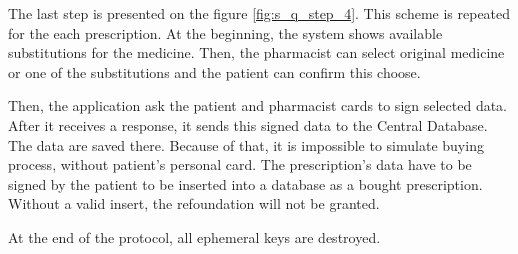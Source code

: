 The last step is presented on the figure \ref{fig:s_q_step_4}. This scheme is repeated for the each prescription. At the beginning, the system shows available substitutions for the medicine. Then, the pharmacist can select original medicine or one of the substitutions and the patient can confirm this choose. 

Then, the application ask the patient and pharmacist cards to sign selected data. After it receives a response, it sends this signed data to the Central Database. The data are saved there. Because of that, it is  impossible to simulate buying process, without patient's personal card. The prescription's data have to be signed by the patient to be inserted into a database as a  bought prescription. Without a valid insert, the refoundation will not be granted. 

At the end of the protocol, all ephemeral keys are destroyed. 



